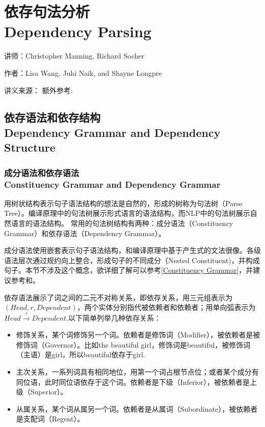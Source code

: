 \chapter{依存句法分析 \\ Dependency Parsing}

\small{讲师：Christopher Manning, Richard Socher}

\small{作者：Lisa Wang, Juhi Naik, and Shayne Longpre}

\small{讲义来源：\cite{04-this_notes} 额外参考:\cite{04-this_slides}}



\section{依存语法和依存结构 \\ Dependency Grammar and Dependency Structure}

\subsection*{成分语法和依存语法 \\ Constituency Grammar and Dependency Grammar}

用树状结构表示句子语法结构的想法是自然的，形成的树称为句法树（Parse Tree）。编译原理中的句法树展示形式语言的语法结构，而NLP中的句法树展示自然语言的语法结构。
常用的句法树结构有两种：成分语法（Constituency Grammar）和依存语法（Dependency Grammar）。

成分语法使用嵌套表示句子语法结构，和编译原理中基于产生式的文法很像。各级语法层次通过规约向上整合，形成句子的不同成分（Nested Constituent)，并构成句子。本节不涉及这个概念，欲详细了解可以参考\ref{Constituency Grammar}，并建议参考\cite{04-phrase-struct-gram}和\cite{04-this_slides}。

依存语法展示了词之间的二元不对称关系，即依存关系，用三元组表示为$(Head, r, Dependent)$，两个实体分别指代被依赖者和依赖者；用单向弧表示为$Head\stackrel{r}{\to}Dependent$.以下简单列举几种依存关系：

\begin{itemize}
    \item 修饰关系，某个词修饰另一个词。依赖者是修饰词（Modifier），被依赖者是被修饰词（Governor）。比如the beautiful girl，修饰词是beautiful，被修饰词（主语）是girl，所以beautiful依存于girl.
    \item 主次关系，一系列词具有相同地位，用第一个词占根节点位；或者某个成分有同位语，此时同位语依存于这个词。依赖者是下级（Inferior），被依赖者是上级（Superior）。
    \item 从属关系，某个词从属另一个词。依赖者是从属词（Subordinate），被依赖者是支配词（Regent）。
\end{itemize}


